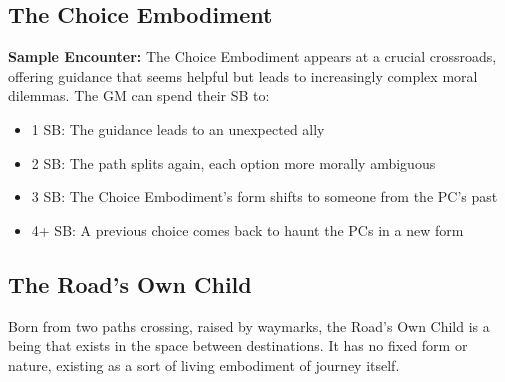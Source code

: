 \documentclass[11pt]{article}
\newenvironment{monsterentry}[1]{%
  \begin{mdframed}[backgroundcolor=shadecolor, linewidth=0pt, leftmargin=0pt, rightmargin=0pt]%
  \subsection*{#1}%
}{%
  \end{mdframed}%
}
\begin{document}
\begin{monsterentry}{The Choice Embodiment}
\begin{itemize}
\end{itemize}
\textbf{Sample Encounter:} The Choice Embodiment appears at a crucial crossroads, offering guidance that seems helpful but leads to increasingly complex moral dilemmas. The GM can spend their SB to:
\begin{itemize}
    \item 1 SB: The guidance leads to an unexpected ally
    \item 2 SB: The path splits again, each option more morally ambiguous
    \item 3 SB: The Choice Embodiment's form shifts to someone from the PC's past
    \item 4+ SB: A previous choice comes back to haunt the PCs in a new form
\end{itemize}
\end{monsterentry}

\subsection{The Road's Own Child}

Born from two paths crossing, raised by waymarks, the Road's Own Child is a being that exists in the space between destinations. It has no fixed form or nature, existing as a sort of living embodiment of journey itself.
\end{document}
